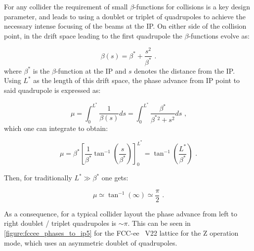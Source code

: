 For any collider the requirement of small \(\beta\)-functions for collisions is a key design parameter, and leads to using a doublet or triplet of quadrupoles to achieve the necessary intense focusing of the beams at the IP.
On either side of the collision point, in the drift space leading to the first quadrupole the \(\beta\)-functions evolve as:

\begin{equation}
    \beta(s)=\beta^* + \frac{s^2}{\beta^*} \text{ .}
    \label{equation:collider_drift_space_beta_function}
\end{equation}
where \(\beta^{*}\) is the \(\beta\)-function at the IP and \(s\) denotes the distance from the IP.
Using \(L^*\) as the length of this drift space, the phase advance from IP point to said quadrupole is expressed as:

\begin{equation}
    \mu = \int_0^{L^*} \frac{1}{\beta(s)} ds = \int_0^{L^*} \frac{\beta^*}{\beta^*{}^2 + s^2} ds \text{ ,}
    \label{equation:collider_drift_space_phase_advance_integral}
\end{equation}
which one can integrate to obtain:

\begin{equation}
    \mu = \beta^* \left[\frac{1}{\beta^*} \tan^{-1} \left(\frac{s}{\beta^*} \right) \right]_0^{L^*} = \tan^{-1} \left(\frac{L^*}{\beta^*} \right) \text{ .}
    \label{equation:collider_drift_space_phase_advance_integrated}
\end{equation}

Then, for traditionally \(L^* \gg \beta^*\) one gets:

\begin{equation}
    \mu \simeq \tan^{-1} \left( \infty \right) \simeq \frac{\pi}{2} \text{ .}
    \label{equation:collider_drift_space_phase_advance_approximation}
\end{equation}

As a consequence, for a typical collider layout the phase advance from left to right doublet / triplet quadrupoles is \(\sim \pi\).
This can be seen in \cref{figure:fccee_phases_to_ip5} for the FCC-ee~\cite{EPJST:Abada:FCCee_Lepton_Collider} V\num{22} lattice for the Z operation mode, which uses an asymmetric doublet of quadrupoles.

